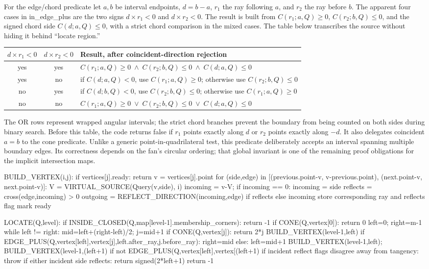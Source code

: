 \documentclass[12pt,a4paper]{article}
\newcommand{\cross}{\mathbin{\times}}
\newcommand{\code}[1]{{\ttfamily\color{codekw}#1}}
\begin{document}
For the edge/chord predicate let \(a,b\) be interval endpoints, \(d=b-a\), \(r_1\) the ray following \(a\), and \(r_2\) the ray before \(b\). The apparent four cases in \code{in\_edge\_plus} are the two signs \(d\cross r_1<0\) and \(d\cross r_2<0\). The result is built from \(C(r_1;a,Q)\ge0\), \(C(r_2;b,Q)\le0\), and the signed chord side \(C(d;a,Q)\le0\), with a strict chord comparison in the mixed cases. The table below transcribes the source without hiding it behind ``locate region.''

\begin{center}\small
\begin{tabular}{@{}ccp{94mm}@{}}\toprule
\(d\cross r_1<0\)&\(d\cross r_2<0\)&Result, after coincident-direction rejection\\\midrule
yes&yes&\(C(r_1;a,Q)\ge0\;\land\;C(r_2;b,Q)\le0\;\land\;C(d;a,Q)\le0\)\\
yes&no&if \(C(d;a,Q)<0\), use \(C(r_1;a,Q)\ge0\); otherwise use \(C(r_2;b,Q)\le0\)\\
no&yes&if \(C(d;b,Q)<0\), use \(C(r_2;b,Q)\le0\); otherwise use \(C(r_1;a,Q)\ge0\)\\
no&no&\(C(r_1;a,Q)\ge0\;\lor\;C(r_2;b,Q)\le0\;\lor\;C(d;a,Q)\le0\)\\\bottomrule
\end{tabular}
\end{center}

The OR rows represent wrapped angular intervals; the strict chord branches prevent the boundary from being counted on both sides during binary search. Before this table, the code returns false if \(r_1\) points exactly along \(d\) or \(r_2\) points exactly along \(-d\). It also delegates coincident \(a=b\) to the cone predicate. Unlike a generic point-in-quadrilateral test, this predicate deliberately accepts an interval spanning multiple boundary edges. Its correctness depends on the fan's circular ordering; that global invariant is one of the remaining proof obligations for the implicit intersection maps.

\begin{pseudo}
BUILD_VERTEX(i,j):
  if vertices[j].ready: return
  v = vertices[j].point
  for (side,edge) in [(previous.point-v, v-previous.point),
                      (next.point-v, next.point-v)]:
      V = VIRTUAL_SOURCE(Query(v,side), i)
      incoming = v-V; if incoming == 0: incoming = side
      reflects = cross(edge,incoming) > 0
      outgoing = REFLECT_DIRECTION(incoming,edge) if reflects else incoming
      store corresponding ray and reflects flag
  mark ready

LOCATE(Q,level):
  if INSIDE_CLOSED(Q,map[level-1].membership_corners): return -1
  if CONE(Q,vertex[0]): return 0
  left=0; right=m-1
  while left != right:
      mid=left+(right-left)/2; j=mid+1
      if CONE(Q,vertex[j]): return 2*j
      BUILD_VERTEX(level-1,left)
      if EDGE_PLUS(Q,vertex[left],vertex[j],left.after_ray,j.before_ray):
          right=mid
      else: left=mid+1
  BUILD_VERTEX(level-1,left); BUILD_VERTEX(level-1,(left+1)%
  if not EDGE_PLUS(Q,vertex[left],vertex[(left+1)%
  if incident reflect flags disagree away from tangency: throw
  if either incident side reflects: return signed(2*left+1)
  return -1
\end{pseudo}
\end{document}
